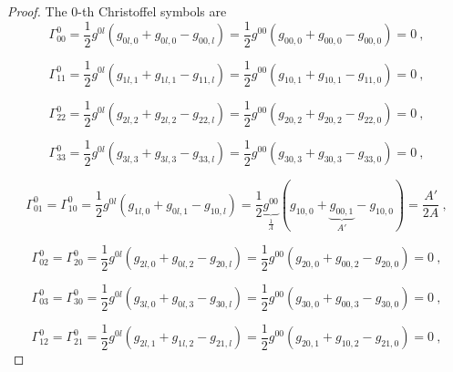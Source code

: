     \begin{proof}
        The $0$-th Christoffel symbols are
        \begin{equation*}
            \Gamma^0_{00} = \frac{1}{2} g^{0l} (g_{0l,0} + g_{0l,0} - g_{00,l}) = \frac{1}{2} g^{00} (g_{00,0} + g_{00,0} - g_{00,0}) = 0 ~,
        \end{equation*}

        \begin{equation*}
            \Gamma^0_{11} = \frac{1}{2} g^{0l} (g_{1l,1} + g_{1l,1} - g_{11,l}) =  \frac{1}{2} g^{00} (g_{10,1} + g_{10,1} - g_{11,0}) = 0 ~,
        \end{equation*}

        \begin{equation*}
            \Gamma^0_{22} = \frac{1}{2} g^{0l} (g_{2l,2} + g_{2l,2} - g_{22,l}) =  \frac{1}{2} g^{00} (g_{20,2} + g_{20,2} - g_{22,0}) = 0 ~,
        \end{equation*}

        \begin{equation*}
            \Gamma^0_{33} = \frac{1}{2} g^{0l} (g_{3l,3} + g_{3l,3} - g_{33,l}) =  \frac{1}{2} g^{00} (g_{30,3} + g_{30,3} - g_{33,0}) = 0 ~,
        \end{equation*}

        \begin{equation*}
            \Gamma^0_{01} = \Gamma^0_{10} = \frac{1}{2} g^{0l} (g_{1l,0} + g_{0l,1} - g_{10,l}) = \frac{1}{2} \underbrace{g^{00}}_{\frac{1}{A}} (g_{10,0} + \underbrace{g_{00,1}}_{A'} - g_{10,0}) = \frac{A'}{2A} ~,
        \end{equation*}

        \begin{equation*}
            \Gamma^0_{02} = \Gamma^0_{20} = \frac{1}{2} g^{0l} (g_{2l,0} + g_{0l,2} - g_{20,l}) = \frac{1}{2} g^{00} (g_{20,0} + g_{00,2} - g_{20,0}) = 0 ~,
        \end{equation*}

        \begin{equation*}
            \Gamma^0_{03} = \Gamma^0_{30} = \frac{1}{2} g^{0l} (g_{3l,0} + g_{0l,3} - g_{30,l}) = \frac{1}{2} g^{00} (g_{30,0} + g_{00,3} - g_{30,0}) = 0 ~,
        \end{equation*}

        \begin{equation*}
            \Gamma^0_{12} = \Gamma^0_{21} = \frac{1}{2} g^{0l} (g_{2l,1} + g_{1l,2} - g_{21,l}) = \frac{1}{2} g^{00} (g_{20,1} + g_{10,2} - g_{21,0}) = 0 ~,
        \end{equation*}


\end{proof}

